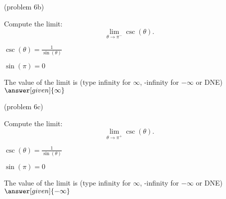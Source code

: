 \documentclass{ximera}
\begin{document}
\begin{problem}(problem 6b)
  
	Compute the limit:
  \[
  \lim_{\theta \to {\pi^-}} \csc(\theta).
  \]
		\begin{hint}
		  $\csc(\theta) = \frac{1}{\sin(\theta)}$
		\end{hint}	
		\begin{hint}
		  $\sin(\pi) = 0$
		\end{hint}
		The value of the limit is
		(type infinity for $\infty$, -infinity for $-\infty$ or DNE)
		 $\answer[given]{\infty}$
		
\end{problem}

\begin{problem}(problem 6c)
  
	Compute the limit:
  \[
  \lim_{\theta \to {\pi^+}} \csc(\theta).
  \]
		\begin{hint}
		  $\csc(\theta) = \frac{1}{\sin(\theta)}$
		\end{hint}	
		\begin{hint}
		  $\sin(\pi) = 0$
		\end{hint}
		The value of the limit is
		(type infinity for $\infty$, -infinity for $-\infty$ or DNE)
		 $\answer[given]{-\infty}$
		
\end{problem}


\begin{center}
\begin{foldable}
\end{foldable}
\end{center}
\end{document}
